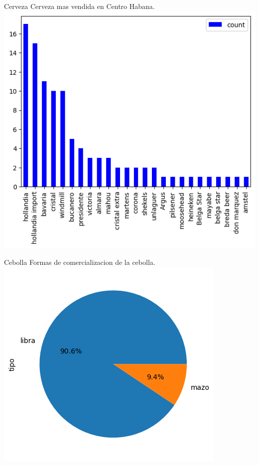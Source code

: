 \documentclass{beamer}
\begin{document}
\begin{frame}{Cerveza} 
    Cerveza mas vendida en Centro Habana.
    \includegraphics[scale=0.5]{Cerv_mas_vendida.png}
    \end{frame}

\begin{frame}{Cebolla}
    Formas de comercializacion de la cebolla.
    \includegraphics[scale=0.5]{Ceb_tipos_de_ventas.png}
    \end{frame}
\end{document}
